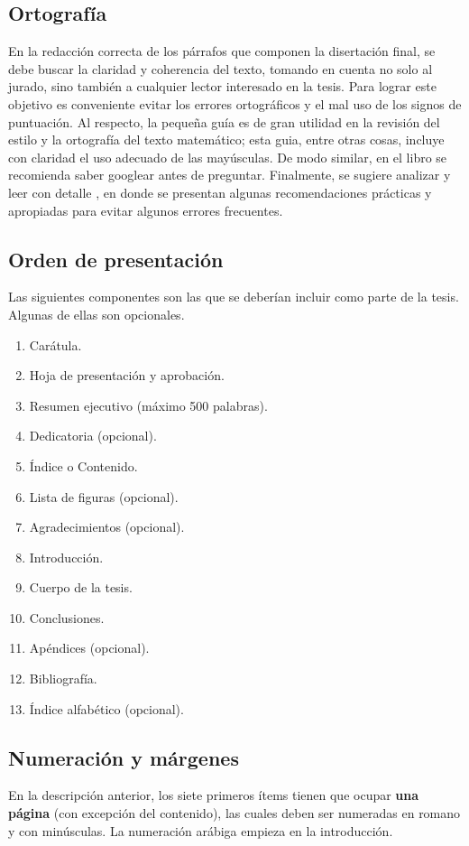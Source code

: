 \subsection{Ortograf\'ia}
En la redacci\'on correcta de los p\'arrafos que componen la disertaci\'on
final, se debe buscar la claridad y coherencia del texto, tomando en cuenta
no solo al jurado, sino tambi\'en a cualquier  lector interesado en la tesis.
Para lograr este objetivo es conveniente evitar los errores ortogr\'aficos y
el mal uso de los signos de puntuaci\'on.
Al respecto, la peque\~na gu\'ia \cite{Milnor1978} es de gran utilidad en la
revisi\'on del estilo y la ortograf\'ia del texto matem\'atico;
esta guia, entre otras cosas, incluye con claridad el uso adecuado de las
may\'usculas. De modo similar, en el libro \cite{BEM2022} se recomienda
saber googlear antes de preguntar.
Finalmente, se sugiere analizar y leer con detalle \cite{Sperner1928},
en donde se presentan algunas recomendaciones pr\'acticas y apropiadas para
evitar algunos errores frecuentes.

\subsection{Orden de presentaci\'on}
Las siguientes componentes son las que se deber\'ian incluir como parte de la
tesis. Algunas de ellas son opcionales.

\begin{enumerate}
  \item Car\'atula.
  \item Hoja de presentaci\'on y aprobaci\'on.
  \item Resumen ejecutivo (m\'aximo 500 palabras).
  \item Dedicatoria (opcional).
  \item \'Indice o Contenido.
  \item Lista de figuras (opcional).
  \item Agradecimientos (opcional).
  \item Introducci\'on.
  \item Cuerpo de la tesis.
  \item Conclusiones.
  \item Ap\'endices (opcional).
  \item Bibliograf\'ia.
  \item \'Indice alfab\'etico (opcional).
\end{enumerate}

\subsection{Numeraci\'on y m\'argenes}
En la descripci\'on anterior,
los siete primeros \'items tienen que ocupar \textbf{una p\'agina}
(con excepci\'on del contenido),
las cuales deben ser numeradas en romano y con min\'usculas.
La numeraci\'on ar\'abiga empieza en la introducci\'on.


